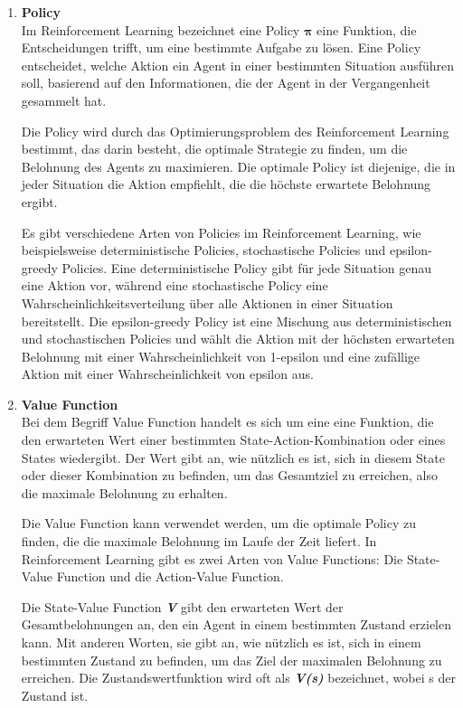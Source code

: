 \begin{enumerate}
    \item \textbf{Policy}\\
    Im Reinforcement Learning bezeichnet eine Policy {$\bm{\pi}$} eine Funktion, die Entscheidungen trifft, um eine bestimmte Aufgabe zu lösen. Eine Policy entscheidet, welche Aktion ein Agent in einer bestimmten Situation ausführen soll, basierend auf den Informationen, die der Agent in der Vergangenheit gesammelt hat.

    Die Policy wird durch das Optimierungsproblem des Reinforcement Learning bestimmt, das darin besteht, die optimale Strategie zu finden, um die Belohnung des Agents zu maximieren. Die optimale Policy ist diejenige, die in jeder Situation die Aktion empfiehlt, die die höchste erwartete Belohnung ergibt.

    Es gibt verschiedene Arten von Policies im Reinforcement Learning, wie beispielsweise deterministische Policies, stochastische Policies und epsilon-greedy Policies. Eine deterministische Policy gibt für jede Situation genau eine Aktion vor, während eine stochastische Policy eine Wahrscheinlichkeitsverteilung über alle Aktionen in einer Situation bereitstellt. Die epsilon-greedy Policy ist eine Mischung aus deterministischen und stochastischen Policies und wählt die Aktion mit der höchsten erwarteten Belohnung mit einer Wahrscheinlichkeit von 1-epsilon und eine zufällige Aktion mit einer Wahrscheinlichkeit von epsilon aus.
    
    \item \textbf{Value Function}\\
    Bei dem Begriff Value Function handelt es sich um eine eine Funktion, die den erwarteten Wert einer bestimmten State-Action-Kombination oder eines States wiedergibt. Der Wert gibt an, wie nützlich es ist, sich in diesem State oder dieser Kombination zu befinden, um das Gesamtziel zu erreichen, also die maximale Belohnung zu erhalten.

    Die Value Function kann verwendet werden, um die optimale Policy zu finden, die die maximale Belohnung im Laufe der Zeit liefert. In Reinforcement Learning gibt es zwei Arten von Value Functions: Die State-Value Function und die Action-Value Function.
    
    Die State-Value Function \textbf{\textit{V}} gibt den erwarteten Wert der Gesamtbelohnungen an, den ein Agent in einem bestimmten Zustand erzielen kann. Mit anderen Worten, sie gibt an, wie nützlich es ist, sich in einem bestimmten Zustand zu befinden, um das Ziel der maximalen Belohnung zu erreichen. Die Zustandswertfunktion wird oft als \textbf{\textit{V(s)}} bezeichnet, wobei s der Zustand ist.
    

\end{enumerate}
